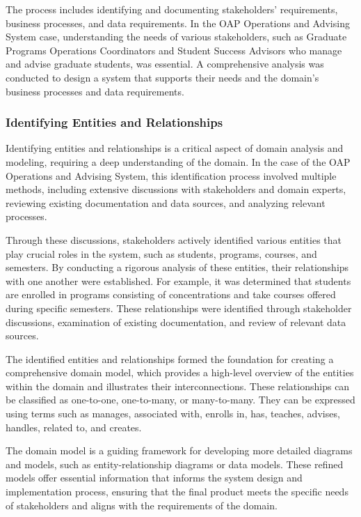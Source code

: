 \documentclass[12pt]{article}
\begin{document}
The process includes identifying and documenting stakeholders' requirements, business processes, and data requirements. In the OAP Operations and Advising System case, understanding the needs of various stakeholders, such as Graduate Programs Operations Coordinators and Student Success Advisors who manage and advise graduate students, was essential. A comprehensive analysis was conducted to design a system that supports their needs and the domain's business processes and data requirements.

\subsubsection{Identifying Entities and Relationships}
Identifying entities and relationships is a critical aspect of domain analysis and modeling, requiring a deep understanding of the domain. In the case of the OAP Operations and Advising System, this identification process involved multiple methods, including extensive discussions with stakeholders and domain experts, reviewing existing documentation and data sources, and analyzing relevant processes.

Through these discussions, stakeholders actively identified various entities that play crucial roles in the system, such as students, programs, courses, and semesters. By conducting a rigorous analysis of these entities, their relationships with one another were established. For example, it was determined that students are enrolled in programs consisting of concentrations and take courses offered during specific semesters. These relationships were identified through stakeholder discussions, examination of existing documentation, and review of relevant data sources.

The identified entities and relationships formed the foundation for creating a comprehensive domain model, which provides a high-level overview of the entities within the domain and illustrates their interconnections. These relationships can be classified as one-to-one, one-to-many, or many-to-many. They can be expressed using terms such as manages, associated with, enrolls in, has, teaches, advises, handles, related to, and creates.

The domain model is a guiding framework for developing more detailed diagrams and models, such as entity-relationship diagrams or data models. These refined models offer essential information that informs the system design and implementation process, ensuring that the final product meets the specific needs of stakeholders and aligns with the requirements of the domain.
\end{document}

